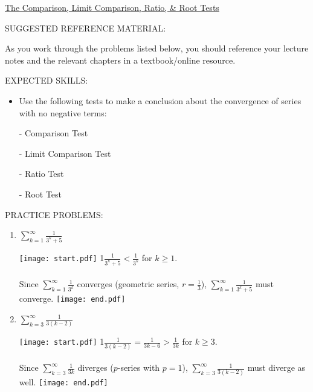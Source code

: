 \documentclass[12pt]{article}
\begin{document}
\begin{center}
\underline{\LARGE{The Comparison, Limit Comparison, Ratio, \& Root Tests}}
\end{center}

\noindent SUGGESTED REFERENCE MATERIAL:

\medskip

\noindent As you work through the problems listed below, you should reference your lecture notes and the relevant chapters in a textbook/online resource.

\medskip

\noindent EXPECTED SKILLS:

\medskip

\begin{itemize}[topsep=0pt]

\item Use the following tests to make a conclusion about the convergence of series with no negative terms:

- Comparison Test 

- Limit Comparison Test 

- Ratio Test 

- Root Test 

\end{itemize}

\medskip

\noindent PRACTICE PROBLEMS:

\medskip


\begin{enumerate}

\item $\sum_{k=1}^{\infty}{\frac{1}{3^k+5}}$

\texttt{[image: start.pdf]}
{{{1\linewidth}{$\frac{1}{3^k+5}<\frac{1}{3^k}$ for $k\geq1$.  \\ \\ Since $\sum_{k=1}^{\infty}{\frac{1}{3^k}}$ converges (geometric series, $\textstyle r=\frac{1}{3}$), $\sum_{k=1}^{\infty}{\frac{1}{3^k+5}}$ must converge.}}}
\texttt{[image: end.pdf]}


\item $\sum_{k=3}^{\infty}{\frac{1}{3(k-2)}}$

\texttt{[image: start.pdf]}
{{{1\linewidth}{$\frac{1}{3(k-2)}=\frac{1}{3k-6}>\frac{1}{3k}$ for $k\geq3$.  \\ \\ Since $\sum_{k=3}^{\infty}{\frac{1}{3k}}$ diverges ($p$-series with $p=1$), $\sum_{k=3}^{\infty}{\frac{1}{3(k-2)}}$ must diverge as well.}}}
\texttt{[image: end.pdf]}


\end{enumerate}
\end{document}
